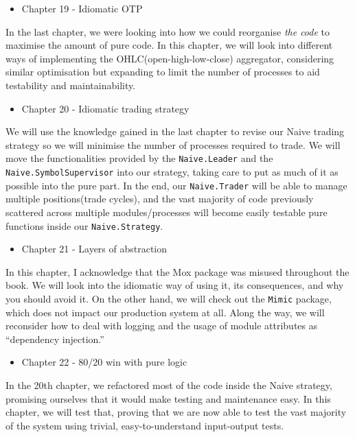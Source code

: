 \documentclass[
  oneside]{book}
\providecommand{\tightlist}{%
  \setlength{\itemsep}{0pt}\setlength{\parskip}{0pt}}
\begin{document}
\begin{itemize}
\tightlist
\item
  Chapter 19 - Idiomatic OTP
\end{itemize}

In the last chapter, we were looking into how we could reorganise \emph{the code} to maximise the amount of pure code. In this chapter, we will look into different ways of implementing the OHLC(open-high-low-close) aggregator, considering similar optimisation but expanding to limit the number of processes to aid testability and maintainability.

\begin{itemize}
\tightlist
\item
  Chapter 20 - Idiomatic trading strategy
\end{itemize}

We will use the knowledge gained in the last chapter to revise our Naive trading strategy so we will minimise the number of processes required to trade. We will move the functionalities provided by the \texttt{Naive.Leader} and the \texttt{Naive.SymbolSupervisor} into our strategy, taking care to put as much of it as possible into the pure part. In the end, our \texttt{Naive.Trader} will be able to manage multiple positions(trade cycles), and the vast majority of code previously scattered across multiple modules/processes will become easily testable pure functions inside our \texttt{Naive.Strategy}.

\begin{itemize}
\tightlist
\item
  Chapter 21 - Layers of abstraction
\end{itemize}

In this chapter, I acknowledge that the Mox package was misused throughout the book. We will look into the idiomatic way of using it, its consequences, and why you should avoid it. On the other hand, we will check out the \texttt{Mimic} package, which does not impact our production system at all. Along the way, we will reconsider how to deal with logging and the usage of module attributes as ``dependency injection.''

\begin{itemize}
\tightlist
\item
  Chapter 22 - 80/20 win with pure logic
\end{itemize}

In the 20th chapter, we refactored most of the code inside the Naive strategy, promising ourselves that it would make testing and maintenance easy. In this chapter, we will test that, proving that we are now able to test the vast majority of the system using trivial, easy-to-understand input-output tests.
\end{document}
